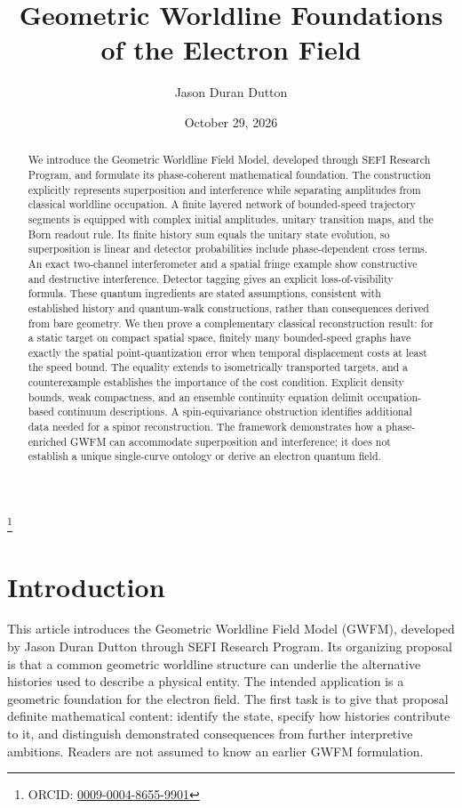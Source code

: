 \documentclass[aip,jmp,reprint,onecolumn,amsmath,amssymb]{revtex4-2}
\theoremstyle{definition}
\begin{document}
\title{Geometric Worldline Foundations of the Electron Field}
\author{Jason Duran Dutton}
\thanks{ORCID: \href{https://orcid.org/0009-0004-8655-9901}{0009-0004-8655-9901}}
\date{October 29, 2026}
\begin{abstract}
We introduce the Geometric Worldline Field Model, developed through SEFI Research Program, and formulate its phase-coherent mathematical foundation. The construction explicitly represents superposition and interference while separating amplitudes from classical worldline occupation. A finite layered network of bounded-speed trajectory segments is equipped with complex initial amplitudes, unitary transition maps, and the Born readout rule. Its finite history sum equals the unitary state evolution, so superposition is linear and detector probabilities include phase-dependent cross terms. An exact two-channel interferometer and a spatial fringe example show constructive and destructive interference. Detector tagging gives an explicit loss-of-visibility formula. These quantum ingredients are stated assumptions, consistent with established history and quantum-walk constructions, rather than consequences derived from bare geometry. We then prove a complementary classical reconstruction result: for a static target on compact spatial space, finitely many bounded-speed graphs have exactly the spatial point-quantization error when temporal displacement costs at least the speed bound. The equality extends to isometrically transported targets, and a counterexample establishes the importance of the cost condition. Explicit density bounds, weak compactness, and an ensemble continuity equation delimit occupation-based continuum descriptions. A spin-equivariance obstruction identifies additional data needed for a spinor reconstruction. The framework demonstrates how a phase-enriched GWFM can accommodate superposition and interference; it does not establish a unique single-curve ontology or derive an electron quantum field.
\end{abstract}
\maketitle

\section{Introduction}
This article introduces the Geometric Worldline Field Model (GWFM), developed by Jason Duran Dutton through SEFI Research Program. Its organizing proposal is that a common geometric worldline structure can underlie the alternative histories used to describe a physical entity. The intended application is a geometric foundation for the electron field. The first task is to give that proposal definite mathematical content: identify the state, specify how histories contribute to it, and distinguish demonstrated consequences from further interpretive ambitions. Readers are not assumed to know an earlier GWFM formulation.
\end{document}
